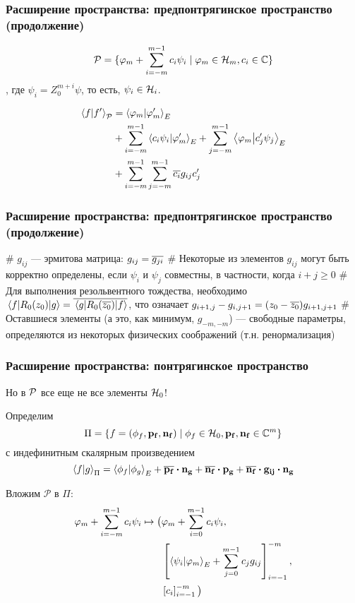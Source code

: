 \documentclass{beamer}
\begin{document}
\begin{frame}[fragile]
\frametitle{Расширение пространства: предпонтрягинское пространство (продолжение)}
\[
\mathcal{P} = 
\{ \varphi_m + \sum\limits_{i = -m}^{m - 1} c_i \psi_i \mid \varphi_m \in \mathcal{H}_{m}, c_i \in \mathbb{C}\}
\]
, где $\psi_i = Z_0^{m + i} \psi$, то есть, $\psi_i \in \mathcal{H}_{i}$.

\begin{align*}
\ip{f}{f'}_{\mcP}
&= \ip{\varphi_m}{\varphi'_m}_E \\
&+ \sum\limits_{i = -m}^{m - 1} \ip{c_i \psi_i}{\varphi'_m}_E + \sum\limits_{j = -m}^{m - 1} \ip{\varphi_m}{c_j' \psi_j}_E \\
&+ \sum\limits_{i = -m}^{m - 1} \sum\limits_{j = -m}^{m - 1} \cconj{c_i} g_{ij} c_j'
\end{align*}
\end{frame}

\begin{frame}[fragile]
\frametitle{Расширение пространства: предпонтрягинское пространство (продолжение)}
\begin{easylist}[itemize]
# $g_{ij}$ — эрмитова матрица: $g_{ij} = \overline{g_{ji}}$
# Некоторые из элементов $g_{ij}$ могут быть корректно определены, если $\psi_i$ и $\psi_j$ совместны, в частности, когда $i + j \ge 0$
# Для выполнения резольвентного тождества, необходимо $\mel{f}{R_0(z_0)}{g} = \overline{\mel{g}{R_0(\overline{z_0})}{f}}$, что означает
$g_{i + 1, j} - g_{i, j + 1} = (z_0 - \overline{z_0}) g_{i + 1, j + 1}$
# Оставшиеся элементы (а это, как минимум, $g_{-m, -m}$) — свободные параметры, определяются из некоторых физических соображений (т.н. ренормализация)
\end{easylist}
\end{frame}

\begin{frame}[fragile]
\frametitle{Расширение пространства: понтрягинское пространство}
Но в $\mathcal{P}$ все еще не все элементы $\mathcal{H}_{0}$!

Определим 
\[
\Pi = \{f = (\phi_f, \vb{p_f}, \vb{n_f}) \mid \phi_f \in \mathcal{H}_{0}, \vb{p_f}, \vb{n_f} \in \mathbb{C}^m \}
\]
с индефинитным скалярным произведением
\[
\ip{f}{g}_\Pi =
\ip{\phi_f}{\phi_g}_E +
\cconj{\vb{p_f}} \vdot \vb{n_g} +
\cconj{\vb{n_f}} \vdot \vb{p_g} + 
\cconj{\vb{n_f}} \vdot \vb{g_{ij}} \vdot \vb{n_g}
\]

Вложим $\mathcal{P}$ в $\Pi$:
\begin{align*}
\varphi_m + \sum\limits_{i = -m}^{m - 1} c_i \psi_i \mapsto
\big(
& \varphi_m + \sum\limits_{i = 0}^{m - 1} c_i \psi_i, \\
& \left[ \ip{\psi_i}{\varphi_m}_E + \sum\limits_{j = 0}^{m - 1} c_j g_{ij} \right]_{i = -1}^{-m}, \\
& \left[ c_i \right]_{i = -1}^{-m}  \big)
\end{align*}
\end{frame}
\end{document}
